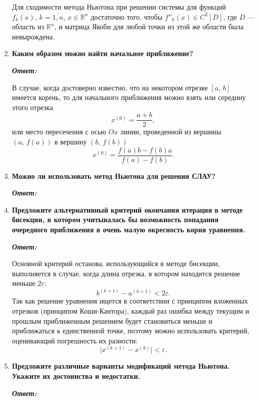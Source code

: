 \documentclass[12pt, a4paper]{article}
\newcommand{\abs}[1]{\lvert #1 \rvert}
\begin{document}
\begin{enumerate}
		Для сходимости метода Ньютона при решении системы для функций $f_k(x), \, k = \overline{1, n}, \, x \in \mathbb{R}^n$ достаточно того, чтобы $f''_k(x) \in C^2[D]$, где $D$ --- область из $\mathbb{R}^n$, и матрица Якоби для любой точки из этой же области была невырождена.

		\item \textbf{Каким образом можно найти начальное приближение?}
		\vspace*{0.2cm}
		
		\textit{\textbf{Ответ:}}

		В случае, когда достоверно известно, что на некотором отрезке $[a, \, b]$ имеется корень, то для начального приближения можно взять или середину этого отрезка 
		\[
		x^{(0)} = \frac {a + b} 2,
		\]
		или место пересечения с осью $Ox$ линии, проведенной из вершины $(a, \, f(a))$ в вершину $(b, \, f(b))$
		\[
		x^{(0)} = \frac {f(a)b - f(b)a} {f(a) - f(b)}.
		\]

		\item \textbf{Можно ли использовать метод Ньютона для решения СЛАУ?}
		\vspace*{0.2cm}
		
		\textit{\textbf{Ответ:}}

		\item \textbf{Предложите альтернативный критерий окончания итерация в методе бисекции, в котором учитывалась бы возможность попадания очередного приближения в очень малую окресность корня уравнения.}
		\vspace*{0.2cm}
		
		\textit{\textbf{Ответ:}}

		Основной критерий останова, использующийся в методе бисекции, выполняется в случае, когда длина отрезка, в котором находится решение меньше $2 \varepsilon$:
		\[
		b^{(k+1)} - a^{(k+1)} < 2 \varepsilon.
		\]
		Так как решение уравнения ищется в соответствии с принципом вложенных отрезков (принципом Коши-Кантора), каждый раз ошибка между текущим и прошлым приближенным решением будет становиться меньше и приближаться к единственной точке, поэтому можно использовать критерий, оценивающий погрешность их разности:
		\[
		\abs{x^{(k+1)} - x^{(k)}} < \varepsilon.
		\]

		\item \textbf{Предложите различные варианты модификаций метода Ньютона. Укажите их достоинства и недостатки.}
		\vspace*{0.2cm}
		
		\textit{\textbf{Ответ:}}


\end{enumerate}
\end{document}
